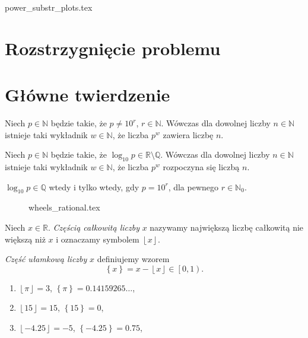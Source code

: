 \documentclass{beamer}
\newcommand{\enumsymbol}{$\triangleright$}
\newcommand{\R}{\mathbb{R}}
\newcommand{\Q}{\mathbb{Q}}
\newcommand{\N}{\mathbb{N}}
\newcommand{\define}[1]{\textit{#1}}
\newcommand{\floor}[1]{\left\lfloor #1 \right\rfloor}
\newcommand{\fracpart}[1]{\left\{ #1 \right\}}
\newcommand{\tmpdatapath}{../tmp_data/}
\begin{document}
{power_substr_plots.tex}



\section{Rozstrzygnięcie problemu}
\section{Główne twierdzenie}

\begin{frame}
  \begin{theorem}
    Niech $p \in \N$ będzie takie, że $p \not = 10^r$, $r \in \N$.
    Wówczas dla dowolnej liczby $n \in \N$ istnieje taki wykładnik $w \in \N$, że liczba $p^w$ zawiera liczbę $n$.
  \end{theorem}
  \begin{lemma}
    \label{lemma::powers_begin_with_every_string}
    Niech $p \in \N$ będzie takie, że $\log_{10}p \in \R \setminus \Q$.
    Wówczas dla dowolnej liczby $n \in \N$ istnieje taki wykładnik $w \in \N$, że liczba $p^w$ rozpoczyna się liczbą $n$. 
  \end{lemma}
  \begin{lemma}
    \label{lemma::log_10_irrational_iff}
    $\log_{10}p \in \Q$ wtedy i tylko wtedy, gdy $p = 10^r$, dla pewnego $r \in \N_0$.
  \end{lemma}
\end{frame}

\begin{frame}
  \begin{figure}
    {wheels_rational.tex}
  \end{figure}
\end{frame}

\begin{frame}
\begin{definition}
Niech $x \in \R$.
\define{Częścią całkowitą liczby} $x$ nazywamy największą liczbę całkowitą nie większą niż $x$ i oznaczamy symbolem $\floor{x}$.

\define{Część ułamkową liczby} $x$ definiujemy wzorem
\begin{equation*}
\fracpart{x} = x-\floor{x} \in \left[0, 1\right).
\end{equation*}
\end{definition}
\begin{example}
  \begin{enumerate}[label=\enumsymbol]
    \item $\floor{\pi} = 3$, $\fracpart{\pi} = 0.14159265\ldots{}$,
    \item $\floor{15} = 15$, $\fracpart{15} = 0$,
    \item $\floor{-4.25} = -5$, $\fracpart{-4.25} = 0.75$, 
  \end{enumerate}
\end{example}
\end{frame}
\end{document}
